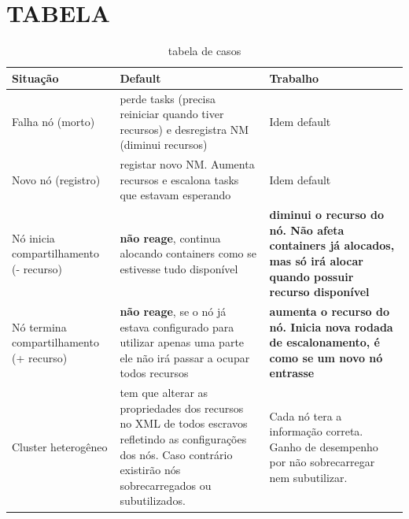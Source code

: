 \section{TABELA}
\begin{table}[!h]
	\centering
	\begin{tabular}{|p{3.0cm}|p{6.0cm}|p{6.0cm}|}
		\hline
		Situação & Default & Trabalho \\
		\hline
		Falha nó (morto) & perde tasks (precisa reiniciar quando tiver recursos) e desregistra NM (diminui recursos) & Idem default\\
		\hline
		Novo nó (registro) & registar novo NM. Aumenta recursos e escalona tasks que estavam esperando & Idem default\\
		\hline
		Nó inicia compartilhamento (- recurso) & \textbf{não reage}, continua alocando containers como se estivesse tudo disponível & \textbf{diminui o recurso do nó. Não afeta containers já alocados, mas só irá alocar quando possuir recurso disponível}\\
		\hline
		Nó termina compartilhamento (+ recurso) &\textbf{não reage}, se o nó já estava configurado para utilizar apenas uma parte ele não irá passar a ocupar todos recursos & \textbf{aumenta o recurso do nó. Inicia nova rodada de escalonamento, é como se um novo nó entrasse}\\
		\hline
		Cluster heterogêneo & tem que alterar as propriedades dos recursos no XML de todos escravos refletindo as configurações dos nós. Caso contrário existirão nós sobrecarregados ou subutilizados. & Cada nó tera a informação correta. Ganho de desempenho por não sobrecarregar nem subutilizar.\\
		\hline
		
	\end{tabular}
	\caption{tabela de casos}
	\label{tab:memory allocation}
\end{table}

